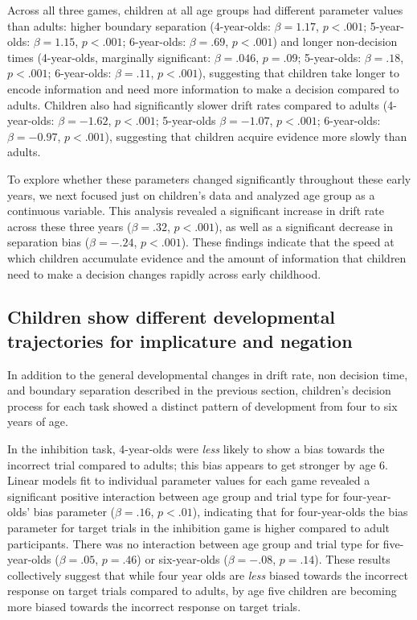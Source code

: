 \documentclass[10pt,letterpaper]{article}
\begin{document}
Across all three games, children at all age groups had different parameter values than adults: higher boundary separation (4-year-olds: $\beta = 1.17$, $p <.001$; 5-year-olds: $\beta = 1.15$, $p <.001$; 6-year-olds: $\beta = .69$, $p <.001$) and longer non-decision times (4-year-olds, marginally significant: $\beta = .046$, $p = .09$; 5-year-olds: $\beta = .18$, $p <.001$; 6-year-olds: $\beta = .11$, $p <.001$), suggesting that children take longer to encode information and need more information to make a decision compared to adults. Children also had significantly slower drift rates compared to adults
(4-year-olds: $\beta = -1.62$, $p <.001$; 5-year-olds $\beta = -1.07$, $p <.001$; 6-year-olds: $\beta = -0.97$, $p <.001$), suggesting that children acquire evidence more slowly than adults.

To explore whether these parameters changed significantly throughout these early years, we next focused just on children's data and analyzed age group as a continuous variable. This analysis revealed a significant increase in drift rate across these three years ($\beta = .32$, $p < .001$), as well as a significant decrease in separation bias ($\beta = -.24$, $p < .001$). These findings indicate that the speed at which children accumulate evidence and the amount of information that children need to make a decision changes rapidly across early childhood.

\subsection{Children show different developmental trajectories for implicature and negation}

In addition to the general developmental changes in drift rate, non decision time, and boundary separation described in the previous section, children's decision process for each task showed a distinct pattern of development from four to six years of age.

In the inhibition task, 4-year-olds were \emph{less} likely to show a bias towards the incorrect trial compared to adults; this bias appears to get stronger by age 6. Linear models fit to individual parameter values for each game revealed a significant positive interaction between age group and trial type for four-year-olds' bias parameter ($\beta = .16$, $p< .01$), indicating that for four-year-olds the bias parameter for target trials in the inhibition game is higher compared to adult participants. There was no interaction between age group and trial type for five-year-olds ($\beta = .05$, $p = .46$) or six-year-olds ($\beta = -.08$, $p = .14$). These results collectively suggest that while four year olds are \emph{less} biased towards the incorrect response on target trials compared to adults, by age five children are becoming more biased towards the incorrect response on target trials.
\end{document}

